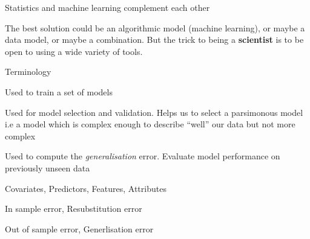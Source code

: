 \documentclass[pdf]{beamer}
\begin{document}
\normalsize
\begin{frame}{Statistics and machine learning complement each other}
\begin{exampleblock}{}
{\small The best solution could be an algorithmic model (machine learning), or maybe a data model, or maybe a combination. But the trick to being a \textbf{scientist} is to be open to using a wide variety of tools.}
\vskip5mm
\hspace*{}
\end{exampleblock}
\end{frame}
\begin{frame}{Terminology}
\begin{description}\addtolength{\itemsep}{0.5\baselineskip}
	\item<2->[Training Dataset:] Used to train a set of models
	\item<3->[Validation Dataset:] Used for model selection and validation. Helps us to select a 
	parsimonous model i.e a model which is complex enough to describe ``well'' our data but not more 
	complex
	\item<4->[Testing Dataset:] Used to compute the \textit{generalisation} error. Evaluate model
	performance on previously unseen data 
	\item<5->[Inputs:] Covariates, Predictors, Features, Attributes
	\item<6->[Training error:] In sample error, Resubstitution error
	\item<7->[Testing error:] Out of sample error, Generlisation error
\end{description}
\end{frame}
\end{document}
